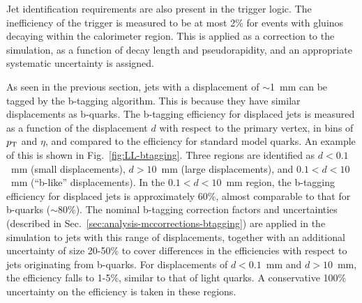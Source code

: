 Jet identification requirements are also present in the trigger logic. The 
inefficiency of the trigger is measured to be at most 2\% for events with 
gluinos decaying within the calorimeter region. This is applied as a correction 
to the simulation, as a function of decay length and pseudorapidity, and an 
appropriate systematic uncertainty is assigned.

As seen in the previous section, jets with a displacement of $\sim$1~mm can be 
tagged by the b-tagging algorithm. This is because they have similar 
displacements as b-quarks.
The b-tagging efficiency for displaced jets is measured as a 
function of the displacement $d$ with respect to the primary vertex, in bins of 
${p_{\text T}}$ and $\eta$, and compared to the 
efficiency for standard model quarks. An example of this is shown in 
Fig.~\ref{fig:LL-btagging}. 
Three regions are identified as $d<0.1$~mm (small displacements), $d>10$~mm 
(large displacements), and $0.1<d<10$~mm (``b-like'' displacements). In the 
$0.1<d<10$~mm region, the b-tagging efficiency for displaced jets is 
approximately 60\%, almost comparable to that for b-quarks ($\sim$80\%). The 
nominal b-tagging correction factors and uncertainties (described in 
Sec.~\ref{sec:analysis-mccorrections-btagging}) are applied in the simulation 
to jets with this range of displacements, together with an additional 
uncertainty of size 20-50\% to cover differences in the efficiencies with 
respect to jets originating from b-quarks. For displacements of $d<0.1$~mm and 
$d>10$~mm, the efficiency falls to 1-5\%, similar to that of light quarks. A 
conservative 100\% uncertainty on the efficiency is taken in these regions.

